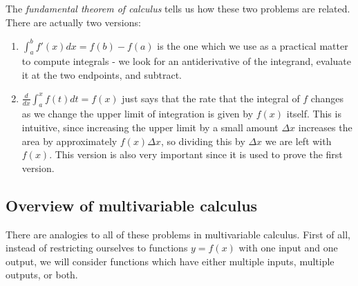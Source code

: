 \documentclass[12pt,letterpaper,reqno]{article}
\numberwithin{equation}{section}
\newcommand{\ti}[1]{\textit{#1}}
\begin{document}
The \ti{fundamental theorem of calculus} tells us how these two problems are related. There are actually two versions:
\begin{enumerate}
	\item $\int_a^b f'(x)dx=f(b)-f(a)$ is the one which we use as a practical matter to compute integrals - we look for an antiderivative of the integrand, evaluate it at the two endpoints, and subtract.
	\item $\frac{d}{dx}\int_a^xf(t)dt=f(x)$ just says that the rate that the integral of $f$ changes as we change the upper limit of integration is given by $f(x)$ itself. This is intuitive, since increasing the upper limit by a small amount $\Delta x$ increases the area by approximately $f(x)\Delta x$, so dividing this by $\Delta x$ we are left with $f(x)$. This version is also very important since it is used to prove the first version.
\end{enumerate}

\subsection{Overview of multivariable calculus}
There are analogies to all of these problems in multivariable calculus. First of all, instead of restricting ourselves to functions $y=f(x)$ with one input and one output, we will consider functions which have either multiple inputs, multiple outputs, or both. 
\end{document}
